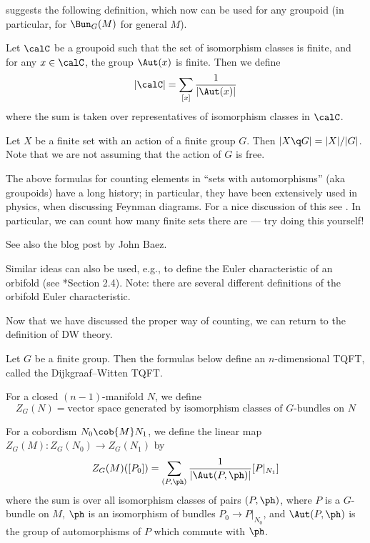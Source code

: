  suggests the following definition, which now
can be used for any groupoid (in particular, for $\Bun_G(M)$ for general $M$).
\begin{definition}\label{d:count}
  Let $\calC$ be a groupoid such that the set of isomorphism classes is finite,
  and for any $x\in \calC$, the group
  $\Aut(x)$ is finite. Then we define
  $$
  |\calC|=\sum_{[x]} \frac{1}{|\Aut(x)|}
  $$
  where the sum is taken over representatives of isomorphism classes in $\calC$.
\end{definition}
\begin{example}\label{x:action-groupoid}
  Let $X$ be a finite set with an action of a finite group $G$.
  Then $|X\q G|=|X|/|G|$. Note that we are not assuming that the
  action of $G$ is free.
\end{example}
The above formulas for counting elements in ``sets with automorphisms'' (aka
groupoids) have a long history; in particular, they have been extensively used
in physics, when discussing Feynman diagrams. For a nice discussion of this see
. In particular, we can count how many finite sets
there are --- try doing this yourself!

See also the blog post  by John Baez.


Similar ideas can also be used, e.g., to define the Euler characteristic of
an orbifold (see *{Section 2.4}). Note: there are several
different definitions of the orbifold Euler characteristic.

Now that we have discussed the proper way of counting, we can return to the
definition of DW theory.

\begin{theorem}\label{t:DW}
  Let $G$ be a finite group. Then the formulas below define an
  $n$-dimensional TQFT, called the Dijkgraaf--Witten TQFT.

  For a closed $(n-1)$-manifold $N$, we define
  $$
    Z_G(N)=\text{vector space generated by isomorphism classes of
                  $G$-bundles on $N$}
  $$

  For a cobordism $N_0\cob{M}N_1$, we define the linear map
  $Z_G(M)\colon Z_G(N_0)\to Z_G(N_1)$ by
  $$
    Z_G(M)([P_0])=\sum_{(P, \ph)} \frac{1}{|\Aut(P,\ph)|} [P|_{N_1}]
  $$
  where the sum is over all isomorphism classes of pairs $(P, \ph)$, where
  $P$ is a $G$-bundle on $M$, $\ph$ is an isomorphism of
  bundles $P_0\to P|_{N_0}$, and $\Aut(P, \ph)$ is the group of
  automorphisms of $P$ which commute with $\ph$.
\end{theorem}

